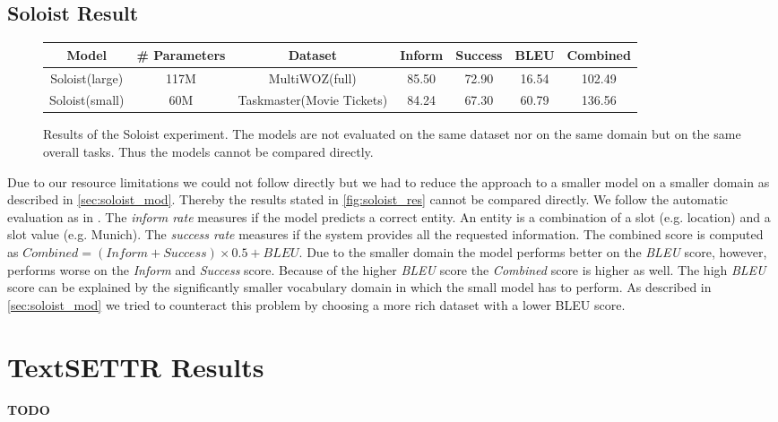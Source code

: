 \documentclass[twocolumn]{tum-article}
\begin{document}
\subsection{Soloist Result}
\begin{figure}[!h]
\centering
\begin{tabular}{c|c|c|c|c|c|c}
\hline
\textbf{Model} & \textbf{\# Parameters} & \textbf{Dataset} & \textbf{Inform} & \textbf{Success} & \textbf{BLEU} & \textbf{Combined}\\
\hline
Soloist(large) & 117M & MultiWOZ(full) & 85.50 & 72.90 & 16.54 & 102.49 \\
\hline
Soloist(small) & 60M & Taskmaster(Movie Tickets) & 84.24 & 67.30 & 60.79 & 136.56\\
\hline
\end{tabular}
\caption{Results of the Soloist experiment. The models are not evaluated on the same dataset nor on the same domain but on the same overall tasks. Thus the models cannot be compared directly. }
\label{fig:soloist_res}
\end{figure}
Due to our resource limitations we could not follow \cite{peng2020soloist} directly but we had to reduce the approach to a smaller model on a smaller domain as described in \autoref{sec:soloist_mod}. Thereby the results stated in \autoref{fig:soloist_res} cannot be compared directly. 
We follow the automatic evaluation as in \cite{peng2020soloist, budzianowski2020multiwoz}. The \textit{inform rate} measures if the model predicts a correct entity. An entity is a combination of a slot (e.g. location) and a slot value (e.g. Munich). The \textit{success rate} measures if the system provides all the requested information. The combined score is computed as $Combined = (Inform + Success) \times 0.5 + BLEU$.
Due to the smaller domain the model performs better on the \textit{BLEU} score, however, performs worse on the \textit{Inform} and \textit{Success} score. Because of the higher \textit{BLEU} score the \textit{Combined} score is higher as well. 
The high \textit{BLEU} score can be explained by the significantly smaller vocabulary domain in which the small model has to perform. As described in \autoref{sec:soloist_mod} we tried to counteract this problem by choosing a more rich dataset with a lower BLEU score.  
\section{TextSETTR Results}
\textbf{TODO}
\end{document}
